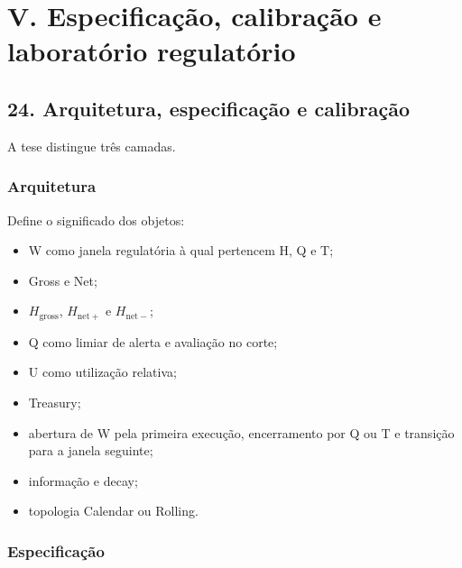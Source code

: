 \documentclass[
  a4paper,
]{article}
\providecommand{\tightlist}{%
  \setlength{\itemsep}{0pt}\setlength{\parskip}{0pt}}
\begin{document}
\hypertarget{v-especificacao-calibracao-e-laboratorio-regulatorio}{}

\hypertarget{v-especificauxe7uxe3o-calibrauxe7uxe3o-e-laboratuxf3rio-regulatuxf3rio-1}{%
\section{V. Especificação, calibração e laboratório
regulatório}\label{v-especificauxe7uxe3o-calibrauxe7uxe3o-e-laboratuxf3rio-regulatuxf3rio-1}}

\hypertarget{24-arquitetura-especificacao-e-calibracao}{}

\hypertarget{24-arquitetura-especificauxe7uxe3o-e-calibrauxe7uxe3o}{%
\subsection{24. Arquitetura, especificação e
calibração}\label{24-arquitetura-especificauxe7uxe3o-e-calibrauxe7uxe3o}}

A tese distingue três camadas.

\hypertarget{arquitetura}{%
\subsubsection{Arquitetura}\label{arquitetura}}

Define o significado dos objetos:

\begin{itemize}
\tightlist
\item
  W como janela regulatória à qual pertencem H, Q e T;
\item
  Gross e Net;
\item
  \(H_{\mathrm{gross}}\), \(H_{\mathrm{net}+}\) e \(H_{\mathrm{net}-}\);
\item
  Q como limiar de alerta e avaliação no corte;
\item
  U como utilização relativa;
\item
  Treasury;
\item
  abertura de W pela primeira execução, encerramento por Q ou T e
  transição para a janela seguinte;
\item
  informação e decay;
\item
  topologia Calendar ou Rolling.
\end{itemize}

\hypertarget{especificauxe7uxe3o}{%
\subsubsection{Especificação}\label{especificauxe7uxe3o}}
\end{document}
